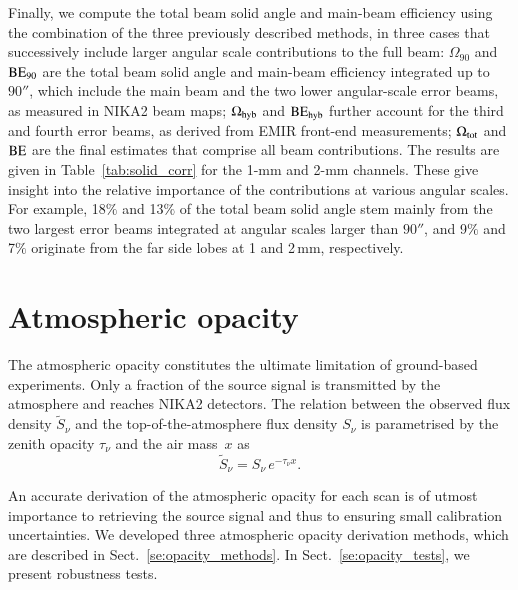 \documentclass[traditionalabstract]{aa}
\newcommand{\elev}{\rm{el}}
\newcommand{\taunu}{\tau_{\nu}}
\newcommand{\airmass}{air mass}
\newcommand{\rev}[1]{#1}
\begin{document}
{{\rev Finally, we compute the total beam solid angle and main-beam
efficiency using the combination of the three previously described
methods, in three cases that successively include larger angular scale
contributions to the full beam: $\Omega_{90}$ and $\rm{BE}_{90}$ are
the total beam solid angle and main-beam efficiency integrated up to
$90''$, which include the main beam and the two lower angular-scale
error beams, as measured in NIKA2 beam maps; $\Omega_{\rm{hyb}}$ and
$\rm{BE}_{\rm{hyb}}$ further account for the third and fourth error
beams, as derived from EMIR front-end measurements; $\Omega_{\rm{tot}}$
and $\rm{BE}$ are the final estimates that comprise all beam
contributions. The results are given in Table~\ref{tab:solid_corr} for
the 1-mm and 2-mm channels. These give insight into the relative
importance of the contributions at various angular scales. For
example, 18$\%$ and 13$\%$ of the total beam solid angle stem mainly
from the two largest error beams integrated at angular
scales larger than $90''$, and 9$\%$ and 7$\%$ originate from the far
side lobes at 1 and 2\,mm, respectively.}


\section{Atmospheric opacity}
\label{se:opacity}
%

The atmospheric opacity constitutes the ultimate limitation of
ground-based experiments. Only a fraction of the source 
signal is transmitted by the atmosphere and reaches NIKA2 detectors. 
The relation between the observed flux density
$\tilde{S}_{\nu}$ and the top-of-the-atmosphere flux density $S_{\nu}$
is parametrised by the zenith opacity $\taunu$
and the \airmass\ $x$ as %
\begin{equation}
\tilde{S}_{\nu} = S_{\nu} \, e^{-\taunu  x}.
\label{eq:uncorr_flux}
\end{equation}

An accurate derivation of the atmospheric opacity for each scan is
of utmost importance to retrieving the source signal and thus to
ensuring small calibration uncertainties.
We developed three atmospheric opacity derivation methods, which are described in
Sect.~\ref{se:opacity_methods}. In Sect.~\ref{se:opacity_tests}, we
present robustness tests.

}
\end{document}
